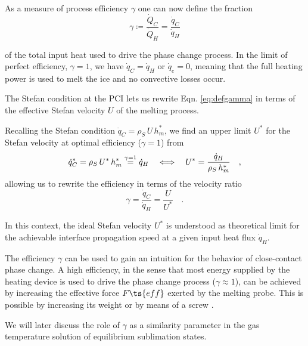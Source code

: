 As a measure of process efficiency $\gamma$ one can now define the fraction
\begin{equation}\label{eq:defgamma}
    \gamma \coloneqq \frac{\Dot{Q}_C}{\Dot{Q}_H} = \frac{\Dot{q}_C}{\Dot{q}_H}
\end{equation}

of the total input heat used to drive the phase change process. In the limit of perfect efficiency, $\gamma = 1$, we have $\Dot{q}_C = \Dot{q}_H$ or $\Dot{q}_e = 0$, meaning that the full heating power is used to melt the ice and no convective losses occur.

The Stefan condition at the \gls{PCI} lets us rewrite Eqn. \ref{eq:defgamma} in terms of the effective Stefan velocity $U$ of the melting process. 

\begin{framed}
Recalling the Stefan condition $\Dot{q}_C = \rho_S\,U\,h_m^*$, we find an upper limit $U^*$ for the Stefan velocity at optimal efficiency ($\gamma = 1$) from
\begin{equation}\notag
     \Dot{q}_C^*  =  \rho_S\,U^*\,h_m^* \overset{\gamma = 1}{=} \Dot{q}_H \quad
    \Longleftrightarrow\quad   U^*=  \frac{\Dot{q}_H}{ \rho_S\,h_m^*}\notag \quad ,
\end{equation}
allowing us to rewrite the efficiency in terms of the velocity ratio
\begin{equation}
    \gamma = \frac{\Dot{q}_C}{\Dot{q}_H} = \frac{U}{U^*} \quad .
\end{equation}

In this context, the ideal Stefan velocity $U^*$ is understood as theoretical limit for the achievable interface propagation speed at a given input heat flux $\Dot{q}_H$.
\end{framed}

The efficiency $\gamma$ can be used to gain an intuition for the behavior of close-contact phase change. A high efficiency, in the sense that most energy supplied by the heating device is used to drive the phase change process ($\gamma\approx 1$), can be achieved by increasing the effective force $F\ts{eff}$ exerted by the melting probe. This is possible by increasing its weight or by means of a screw \cite{dachwald2014icemole}.

We will later discuss the role of $\gamma$ as a similarity parameter in the gas temperature solution of equilibrium sublimation states.



\FloatBarrier